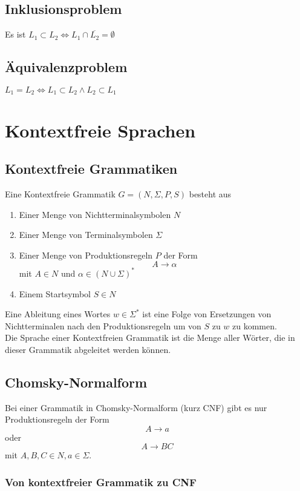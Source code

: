 \documentclass[11pt]{scrartcl}
\begin{document}
\subsection{Inklusionsproblem}
Es ist $L_1 \subset L_2 \Leftrightarrow L_1 \cap \overline{L_2} = \emptyset$

\subsection{Äquivalenzproblem}
$L_1 = L_2 \Leftrightarrow L_1 \subset L_2 \land L_2 \subset L_1$

\section{Kontextfreie Sprachen}

\subsection{Kontextfreie Grammatiken}

Eine Kontextfreie Grammatik $G = (N, \Sigma, P, S)$ besteht aus

\begin{enumerate}
	\item Einer Menge von Nichtterminalsymbolen $N$
    \item Einer Menge von Terminalsymbolen $\Sigma$
    \item Einer Menge von Produktionsregeln $P$ der Form \[A \to \alpha\] mit $A \in N$ und $\alpha \in (N \cup \Sigma)^\ast$\
    \item Einem Startsymbol $S \in N$
\end{enumerate}

Eine Ableitung eines Wortes $w \in \Sigma^\ast$ ist eine Folge von Ersetzungen von Nichtterminalen nach den Produktionsregeln um von $S$ zu $w$ zu kommen. \\

Die Sprache einer Kontextfreien Grammatik ist die Menge aller Wörter, die in dieser Grammatik abgeleitet werden können.

\subsection{Chomsky-Normalform}

Bei einer Grammatik in Chomsky-Normalform (kurz CNF) gibt es nur Produktionsregeln der Form \[ A \to a \] oder \[A \to BC\] mit $A,B,C \in N, a \in \Sigma$.

\subsubsection{Von kontextfreier Grammatik zu CNF}
\end{document}
